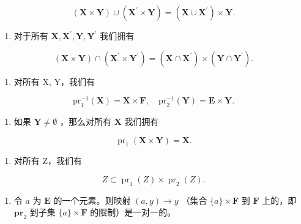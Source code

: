 \[
(\mathbf {X} \times \mathbf {Y}) \cup (\mathbf {X} ^ {\prime} \times \mathbf {Y}) = (\mathbf {X} \cup \mathbf {X} ^ {\prime}) \times \mathbf {Y}.\tag{22}
\]

\begin{enumerate}
\def\labelenumi{(\alph{enumi})}
\setcounter{enumi}{3}
\tightlist
\item
  对于所有 \(\mathbf{X},\mathbf{X}^{\prime},\mathbf{Y},\mathbf{Y}^{\prime}\) 我们拥有
\end{enumerate}

\[
(\mathbf {X} \times \mathbf {Y}) \cap (\mathbf {X} ^ {\prime} \times \mathbf {Y} ^ {\prime}) = (\mathbf {X} \cap \mathbf {X} ^ {\prime}) \times (\mathbf {Y} \cap \mathbf {Y} ^ {\prime}).
\]

\begin{enumerate}
\def\labelenumi{(\alph{enumi})}
\setcounter{enumi}{4}
\tightlist
\item
  对所有 X, Y，我们有
\end{enumerate}

\[
\mathrm{pr} _ {1} ^ {- 1} (\mathbf {X}) = \mathbf {X} \times \mathbf {F}, \quad \mathrm{pr} _ {2} ^ {- 1} (\mathbf {Y}) = \mathbf {E} \times \mathbf {Y}.\tag{24}
\]

\begin{enumerate}
\def\labelenumi{(\alph{enumi})}
\setcounter{enumi}{5}
\tightlist
\item
  如果 \(\mathbf{Y} \neq \emptyset\) ，那么对所有 \(\mathbf{X}\) 我们拥有
\end{enumerate}

\[
\operatorname{pr} _ {1} (\mathbf {X} \times \mathbf {Y}) = \mathbf {X}.\tag{25}
\]

\begin{enumerate}
\def\labelenumi{(\alph{enumi})}
\setcounter{enumi}{6}
\tightlist
\item
  对所有 Z，我们有
\end{enumerate}

\[
Z \subset \operatorname{pr} _ {1} (Z) \times \operatorname{pr} _ {2} (Z).\tag{26}
\]

\begin{enumerate}
\def\labelenumi{(\alph{enumi})}
\setcounter{enumi}{7}
\tightlist
\item
  令 \(a\) 为 \(\mathbf{E}\) 的一个元素。则映射 \((a, y) \to y\) （集合 \(\{a\} \times \mathbf{F}\) 到 \(\mathbf{F}\) 上的，即 \(\mathbf{pr}_2\) 到子集 \(\{a\} \times \mathbf{F}\) 的限制）是一对一的。
\end{enumerate}


